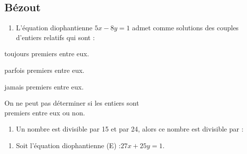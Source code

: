 \documentclass{cornouaille}
\begin{document}
\subsection{Bézout}
\begin{QCM}
\begin{GroupeQCM}
\begin{enumerate}
\setcounter{enumi}{\value{questionqcm}}
\item 
L'équation diophantienne \enskip $5x-8y=1$ admet comme solutions des couples d'entiers relatifs qui sont :
\end{enumerate}
\begin{ChoixQCM}{2}
\item toujours premiers entre eux.
\item parfois premiers entre eux.
\item jamais premiers entre eux.
\item On ne peut pas déterminer si les entiers sont\\ premiers entre eux ou non.
\end{ChoixQCM}
\setcounter{enumii}{0}
\begin{solution}
\end{solution}


\begin{enumerate}
\setcounter{enumi}{\value{questionqcm}}
\item 
Un nombre est divisible par 15 et par 24, alors ce nombre est
divisible par :
\end{enumerate}
\setcounter{enumii}{0}
\begin{solution}
\end{solution}

\begin{enumerate}
\setcounter{enumi}{\value{questionqcm}}
\item 
Soit l'équation diophantienne (E) :\enskip $27x+25y=1$. 
\end{enumerate}
\setcounter{enumii}{0}
\begin{solution}
\end{solution}



\end{GroupeQCM}
\end{QCM}
\end{document}
